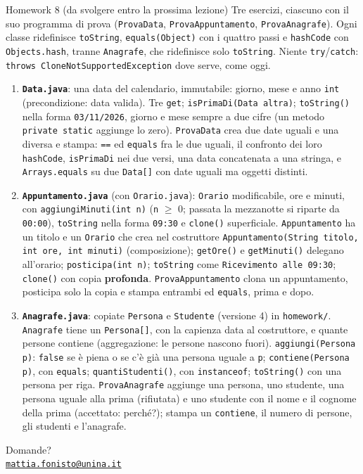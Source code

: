 \documentclass[10pt,aspectratio=169]{beamer}
\begin{document}
\begin{frame}{Homework 8 (da svolgere entro la prossima lezione)}
\footnotesize\setlength{\parskip}{0pt}
Tre esercizi, ciascuno con il suo programma di prova (\texttt{ProvaData}, \texttt{ProvaAppuntamento}, \texttt{ProvaAnagrafe}). Ogni classe ridefinisce \texttt{toString}, \texttt{equals(Object)} con i quattro passi e \texttt{hashCode} con \texttt{Objects.hash}, tranne \texttt{Anagrafe}, che ridefinisce solo \texttt{toString}. Niente \texttt{try}/\texttt{catch}: \texttt{throws CloneNotSupportedException} dove serve, come oggi.
\begin{enumerate}\itemsep=1pt
    \item \textbf{\texttt{Data.java}}: una data del calendario, immutabile: giorno, mese e anno \texttt{int} (precondizione: data valida). Tre \texttt{get}; \texttt{isPrimaDi(Data altra)}; \texttt{toString()} nella forma \texttt{03/11/2026}, giorno e mese sempre a due cifre (un metodo \texttt{private static} aggiunge lo zero). \texttt{ProvaData} crea due date uguali e una diversa e stampa: \texttt{==} ed \texttt{equals} fra le due uguali, il confronto dei loro \texttt{hashCode}, \texttt{isPrimaDi} nei due versi, una data concatenata a una stringa, e \texttt{Arrays.equals} su due \texttt{Data[]} con date uguali ma oggetti distinti.
    \item \textbf{\texttt{Appuntamento.java}} (con \texttt{Orario.java}): \texttt{Orario} modificabile, ore e minuti, con \texttt{aggiungiMinuti(int n)} (\texttt{n} $\geq$ 0; passata la mezzanotte si riparte da \texttt{00:00}), \texttt{toString} nella forma \texttt{09:30} e \texttt{clone()} superficiale. \texttt{Appuntamento} ha un titolo e un \texttt{Orario} che crea nel costruttore \texttt{Appuntamento(String titolo, int ore, int minuti)} (composizione); \texttt{getOre()} e \texttt{getMinuti()} delegano all'orario; \texttt{posticipa(int n)}; \texttt{toString} come \texttt{Ricevimento alle 09:30}; \texttt{clone()} con copia \textbf{profonda}. \texttt{ProvaAppuntamento} clona un appuntamento, posticipa solo la copia e stampa entrambi ed \texttt{equals}, prima e dopo.
    \item \textbf{\texttt{Anagrafe.java}}: copiate \texttt{Persona} e \texttt{Studente} (versione 4) in \texttt{homework/}. \texttt{Anagrafe} tiene un \texttt{Persona[]}, con la capienza data al costruttore, e quante persone contiene (aggregazione: le persone nascono fuori). \texttt{aggiungi(Persona p)}: \texttt{false} se è piena o se c'è già una persona uguale a \texttt{p}; \texttt{contiene(Persona p)}, con \texttt{equals}; \texttt{quantiStudenti()}, con \texttt{instanceof}; \texttt{toString()} con una persona per riga. \texttt{ProvaAnagrafe} aggiunge una persona, uno studente, una persona uguale alla prima (rifiutata) e uno studente con il nome e il cognome della prima (accettato: perché?); stampa un \texttt{contiene}, il numero di persone, gli studenti e l'anagrafe.
\end{enumerate}
\end{frame}

\begin{frame}
\begin{center}
{\Huge Domande?}\\[2em]
{\normalsize \href{mailto:mattia.fonisto@unina.it}{\texttt{mattia.fonisto@unina.it}}}
\end{center}
\end{frame}
\end{document}
